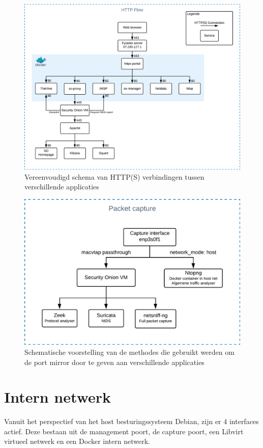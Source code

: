 \documentclass[a4paper,12pt]{report}
\begin{document}
\begin{figure}[H]
  \centering
  \includegraphics[width=\textwidth]{aangepast-systeem-schema-http}
  \caption{Vereenvoudigd schema van HTTP(S) verbindingen tussen verschillende applicaties}
  \label{fig:aangepast-systeem-schema-http}
\end{figure}

\begin{figure}[H]
  \centering
  \includegraphics[width=\textwidth]{aangepast-systeem-schema-pcap}
  \caption{Schematische voorstelling van de methodes die gebruikt werden om de port mirror door te geven aan verschillende applicaties}
  \label{fig:aangepast-systeem-schema-pcap}
\end{figure}

\section{Intern netwerk}
Vanuit het perspectief van het host besturingssysteem Debian, zijn er 4 interfaces actief.
Deze bestaan uit de management poort, de capture poort, een Libvirt virtueel netwerk en een Docker intern netwerk.
\end{document}

